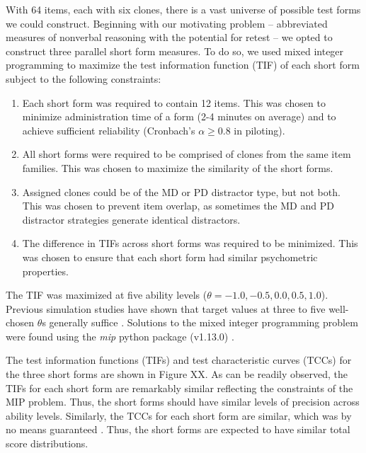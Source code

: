 \documentclass[a4paper,man,natbib]{apa6}
\begin{document}
With 64 items, each with six clones, there is a vast universe of possible test forms we could construct. Beginning with our motivating problem -- abbreviated measures of nonverbal reasoning with the potential for retest -- we opted to construct three parallel short form measures. To do so, we used mixed integer programming \citep{der2005wj} to maximize the test information function (TIF) of each short form subject to the following constraints:

\begin{enumerate}

    \item Each short form was required to contain 12 items. This was chosen to minimize administration time of a form (2-4 minutes on average) and to achieve sufficient  reliability (Cronbach's $\alpha \geq 0.8$ in piloting).
    
    \item All short forms were required to be comprised of clones from the same item families. This was chosen to maximize the similarity of the short forms.
    
    \item Assigned clones could be of the MD or PD distractor type, but not both. This was chosen to prevent item overlap, as sometimes the MD and PD distractor strategies generate identical distractors.
    
    \item The difference in TIFs across short forms was required to be minimized. This was chosen to ensure that each short form had similar psychometric properties. 
    
\end{enumerate}

\noindent The TIF was maximized at five ability levels ($\theta = -1.0, -0.5, 0.0, 0.5, 1.0$). Previous simulation studies have shown that target values at three to five well-chosen $\theta$s generally suffice \citep{der2005wj}. Solutions to the mixed integer programming problem were found using the \textit{mip} python package (v1.13.0) \citep{santos2020mixed}.

The test information functions (TIFs) and test characteristic curves (TCCs) for the three short forms are shown in Figure XX. As can be readily observed, the TIFs for each short form are remarkably similar reflecting the constraints of the MIP problem. Thus, the short forms should have similar levels of precision across ability levels. Similarly, the TCCs for each short form are similar, which was by no means guaranteed \citep{ali2016evaluation}. Thus, the short forms are expected to have similar total score distributions.
\end{document}

